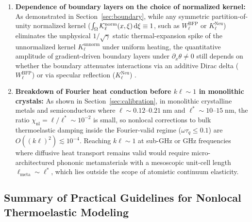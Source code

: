 \begin{enumerate}[leftmargin=*,align=left]
  \item \textbf{Dependence of boundary layers on the choice of normalized kernel:} As demonstrated in Section~\ref{sec:boundary}, while any symmetric partition-of-unity normalized kernel ($\int_\Omega \mathcal{K}_\ell^{\mathrm{norm}}(x,\xi)\,\mathrm{d}\xi \equiv 1$, such as $W_\ell^{\mathrm{BFP}}$ or $K_\ell^{\mathrm{Neu}}$) eliminates the unphysical $1/\sqrt{\gamma}$ static thermal-expansion spike of the unnormalized kernel $K_\ell^{\mathrm{unnorm}}$ under uniform heating, the quantitative amplitude of gradient-driven boundary layers under $\partial_x\theta \neq 0$ still depends on whether the boundary attenuates interactions via an additive Dirac delta ($W_\ell^{\mathrm{BFP}}$) or via specular reflection ($K_\ell^{\mathrm{Neu}}$) \cite{BazantLeHoover2010,NobiliPramanik2025b}.
  \item \textbf{Breakdown of Fourier heat conduction before $k\ell \sim 1$ in monolithic crystals:} As shown in Section~\ref{sec:calibration}, in monolithic crystalline metals and semiconductors where $\ell \sim 0.12$--$0.21\;\mathrm{nm}$ and $\ell^* \sim 10$--$15\;\mathrm{nm}$, the ratio $\chi_{\mathrm{nl}} = \ell/\ell^* \sim 10^{-2}$ is small, so nonlocal corrections to bulk thermoelastic damping inside the Fourier-valid regime ($\omega\tau_q \le 0.1$) are $O((k\ell)^2) \lesssim 10^{-4}$. Reaching $k\ell \sim 1$ at sub-GHz or GHz frequencies where diffusive heat transport remains valid would require micro-architectured phononic metamaterials with a mesoscopic unit-cell length $\ell_{\mathrm{meta}} \sim \ell^*$, which lies outside the scope of atomistic continuum elasticity.
\end{enumerate}

\subsection{Summary of Practical Guidelines for Nonlocal Thermoelastic Modeling}\label{subsec:guidelines}

